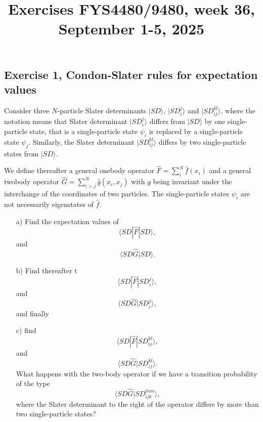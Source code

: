 \documentclass[prc]{revtex4}
\begin{document}
\title{Exercises FYS4480/9480, week 36, September 1-5, 2025}
\maketitle
\subsection*{Exercise 1, Condon-Slater rules for expectation values}
Consider three $N$-particle 
Slater determinants $|SD\rangle$, $|SD_i^j\rangle$ and $|SD_{ij}^{kl}\rangle$, where the notation means that 
Slater determinant $|SD_i^j\rangle$ differs from $|SD\rangle$ by one single-particle state, that is a single-particle
state $\psi_i$ is replaced by a single-particle state $\psi_j$. Similarly, the Slater determinant $|SD_{ij}^{kl}\rangle$
differs by two single-particle states from $|SD\rangle$.

We define thereafter a general onebody operator $\hat{F} = \sum_{i}^N\hat{f}(x_{i})$ and a general 
twobody operator $\hat{G}=\sum_{i>j}^N\hat{g}(x_{i},x_{j})$
with $g$ being invariant under the interchange of the coordinates of two particles.
The single-particle states $\psi_i$ are not necessarily eigenstates of $\hat{f}$.
\begin{enumerate}
\item[a)] Find the expectation values of 
\[
\langle SD |\hat{F}|SD\rangle,
\]
and
\[
\langle SD\hat{G}|SD\rangle.
\]
\item[b)] Find thereafter t
\[
\langle SD |\hat{F}|SD_i^j\rangle,
\]
and
\[
\langle SD\hat{G}|SD_i^j\rangle,
\]
and finally
\item[c)] find 
\[
\langle SD |\hat{F}|SD_{ij}^{kl}\rangle,
\]
and
\[
\langle SD\hat{G}|SD_{ij}^{kl}\rangle.
\]
What happens with the two-body operator if we have a transition probability  of the type
\[
\langle SD\hat{G}|SD_{ijk}^{lmn}\rangle,
\]
where the Slater determinant to the right of the operator differs by more than two single-particle states?
\end{enumerate}
\end{document}
